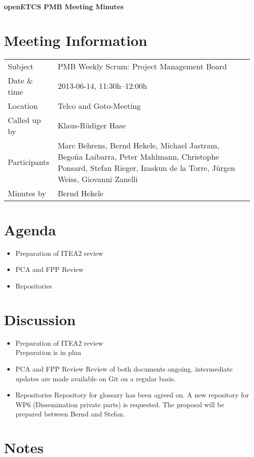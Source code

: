 \documentclass[a4paper, 11pt]{article}
\begin{document}
{\begin{center}\huge\bf openETCS PMB Meeting Minutes\end{center}}
\section{Meeting Information}

\renewcommand{\arraystretch}{1.5}
\begin{supertabular}{m{.2\textwidth}m{.8\textwidth}}
Subject & PMB Weekly Scrum: Project Management Board\\
Date \& time & 2013-06-14, 11:30h--12:00h\\
Location & Telco and Goto-Meeting\\
Called up by & Klaus-R\"udiger Hase\\
Participants &
Marc Behrens,
Bernd Hekele,
Michael Jastram,
Bego\~na Laibarra,
Peter Mahlmann,
Christophe Ponsard,
Stefan Rieger,
Izaskun de la Torre,
J\"urgen Weiss,
Giovanni Zanelli
\\

Minutes by & Bernd Hekele\\

\end{supertabular}
\renewcommand{\arraystretch}{1.0}


\section{{Agenda}}
\begin{itemize}
\item Preparation of ITEA2 review
\item PCA and FPP Review
\item Repositories
\end{itemize}

\section{Discussion}
\begin{itemize}
\item Preparation of ITEA2 review\\
Preparation is in plan\\

\item PCA and FPP Review
Review of both documents ongoing. intermediate updates are made available on Git on a regular basis.

\item Repositories
Repository for glossary has been agreed on. A new repository for WP6 (Dissemination private parts) is requested. The proposal will be prepared between Bernd and Stefan.
\end{itemize}

\section{Notes}
\end{document}
